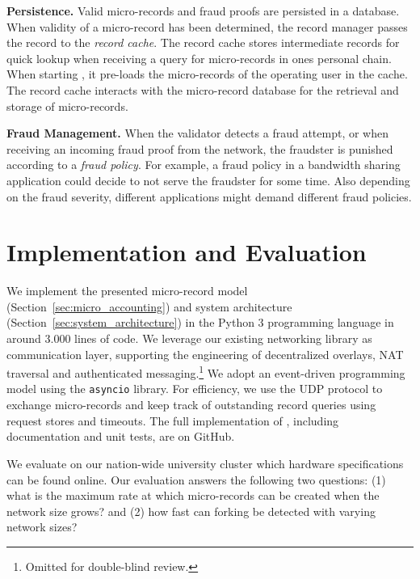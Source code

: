 
\textbf{Persistence.}
Valid micro-records and fraud proofs are persisted in a database.
When validity of a micro-record has been determined, the record manager passes the record to the \emph{record cache}.
The record cache stores intermediate records for quick lookup when receiving a query for micro-records in ones personal chain.
When starting \ModelName{}, it pre-loads the micro-records of the operating user in the cache.
The record cache interacts with the micro-record database for the retrieval and storage of micro-records.

\textbf{Fraud Management.}
When the validator detects a fraud attempt, or when receiving an incoming fraud proof from the network, the fraudster is punished according to a \emph{fraud policy}.
For example, a fraud policy in a bandwidth sharing application could decide to not serve the fraudster for some time.
Also depending on the fraud severity, different applications might demand different fraud policies.

\section{Implementation and Evaluation}
\label{sec:implementation_evaluation}
We implement the presented micro-record model (Section~\ref{sec:micro_accounting}) and system architecture (Section~\ref{sec:system_architecture}) in the Python 3 programming language in around 3.000 lines of code.
We leverage our existing networking library as communication layer, supporting the engineering of decentralized overlays, NAT traversal and authenticated messaging.\footnote{Omitted for double-blind review.}
We adopt an event-driven programming model using the \texttt{asyncio} library.
For efficiency, we use the UDP protocol to exchange micro-records and keep track of outstanding record queries using request stores and timeouts.
The full implementation of \ModelName{}, including documentation and unit tests, are on GitHub.

We evaluate \ModelName{} on our nation-wide university cluster which hardware specifications can be found online.
Our evaluation answers the following two questions: (1) what is the maximum rate at which micro-records can be created when the network size grows? and (2) how fast can forking be detected with varying network sizes?

